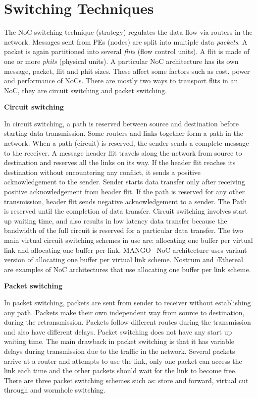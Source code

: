 \section{Switching Techniques}

The NoC switching technique (strategy) regulates the data flow via routers in the network. Messages sent from PEs (nodes) are split into multiple data \textit{ packets}. A packet is again partitioned into several \textit{flits} (flow control units). A flit is made of one or more \textit{phits} (physical units). A particular NoC architecture has its own message, packet, flit and phit sizes. These affect some factors such as cost, power and performance of NoCs. There are mostly two ways to transport flits in an NoC, they are circuit switching and packet switching. 

\vspace{10mm}
\noindent\textbf{Circuit switching}
\vspace{5mm}

\noindent In circuit switching, a path is reserved between source and destination before starting data transmission. Some routers and links together form a path in the network. When a path (circuit) is reserved, the sender sends a complete message to the receiver. A message header flit travels along the network from source to destination and reserves all the links on its way. If the header flit reaches its destination without encountering any conflict, it sends a positive acknowledgement to the sender. Sender starts data transfer only after receiving positive acknowledgement from header flit. If the path is reserved for any other transmission, header flit sends negative acknowledgement to a sender. The Path is reserved until the completion of data transfer. Circuit switching involves start up waiting time, and also results in low latency data transfer because the bandwidth of the full circuit is reserved for a particular data transfer. The two main virtual circuit switching schemes in use are: allocating one buffer per virtual link and allocating one buffer per link. MANGO~\cite{Bjerregaard} NoC architecture uses variant version of allocating one buffer per virtual link scheme. Nostrum and \AE{thereal} are examples of NoC architectures that use allocating one buffer per link
scheme.

\vspace{0.5cm}
\noindent\textbf{Packet switching}
\vspace{5mm}

\noindent In packet switching, packets are sent from sender to receiver without establishing any path. Packets make their own independent way from source to destination, during the retransmission. Packets follow different routes during the transmission and also have different delays. Packet switching does not have any start up waiting time. The main drawback in packet switching is that it has variable delays during transmission due to the traffic in the network. Several packets arrive at a router and attempts to use the link, only one packet can access the link each time and the other packets should wait for the link to become free. There are three packet switching schemes such as: store and forward, virtual cut through and wormhole switching.


